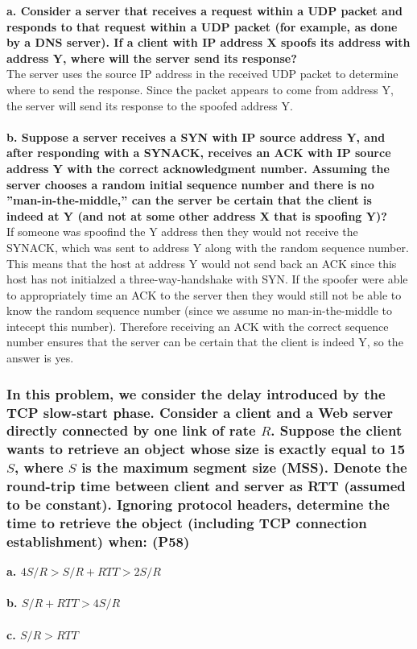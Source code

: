 \textbf{a. Consider a server that receives a request within a UDP packet and responds to that request within a UDP packet (for example, as done by a DNS server). If a client with IP address X spoofs its address with address Y, where will the server send its response?} \\
The server uses the source IP address in the received UDP packet to determine where to send the response. Since the packet appears to come from address Y, the server will send its response to the spoofed address Y. \\
\\
\textbf{b. Suppose a server receives a SYN with IP source address Y, and after responding with a SYNACK, receives an ACK with IP source address Y with the correct acknowledgment number. Assuming the server chooses a random initial sequence number and there is no ''man-in-the-middle,'' can the server be certain that the client is indeed at Y (and not at some other address X that is spoofing Y)?} \\
If someone was spoofind the Y address then they would not receive the SYNACK, which was sent to address Y along with the random sequence number. This means that the host at address Y would not send back an ACK since this host has not initialzed a three-way-handshake with SYN. If the spoofer were able to appropriately time an ACK to the server then they would still not be able to know the random sequence number (since we assume no man-in-the-middle to intecept this number). Therefore receiving an ACK with the correct sequence number ensures that the server can be certain that the client is indeed Y, so the answer is yes.

\subsubsection{In this problem, we consider the delay introduced by the TCP slow-start phase. Consider a client and a Web server directly connected by one link of rate $R$. Suppose the client wants to retrieve an object whose size is exactly equal to 15 $S$, where $S$ is the maximum segment size (MSS). Denote the round-trip time between client and server as RTT (assumed to be constant). Ignoring protocol headers, determine the time to retrieve the object (including TCP connection establishment) when: (P58)}

\textbf{a. $4 S/R > S/R + RTT > 2 S/R$} \\
\\
\textbf{b. $S/R + RTT > 4 S/R$} \\
\\
\textbf{c. $S/R > RTT$} \\

